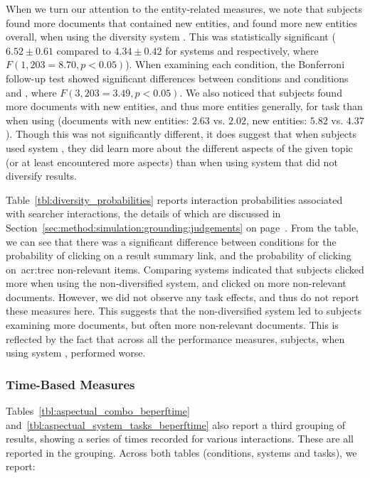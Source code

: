 When we turn our attention to the entity-related measures, we note that subjects found more documents that contained new entities, and found more new entities overall, when using the diversity system . This was statistically significant ($6.52\pm0.61$ compared to $4.34\pm0.42$ for systems  and  respectively, where $F(1,203 = 8.70, p<0.05)$). When examining each condition, the Bonferroni follow-up test showed significant differences between conditions  and conditions  and , where $F(3,203 = 3.49, p < 0.05)$. We also noticed that subjects found more documents with new entities, and thus more entities generally, for task  than when using  (documents with new entities: $2.63$ vs. $2.02$, new entities: $5.82$ vs. $4.37$). Though this was not significantly different, it does suggest that when subjects used system , they did learn more about the different aspects of the given topic (or at least encountered more aspects) than when using system  that did not diversify results.

Table~\ref{tbl:diversity_probabilities} reports interaction probabilities associated with searcher interactions, the details of which are discussed in Section~\ref{sec:method:simulation:grounding:judgements} on page~\pageref{sec:method:simulation:grounding:judgements}. From the table, we can see that there was a significant difference between conditions for the probability of clicking on a result summary link, and the probability of clicking on~\gls{acr:trec} non-relevant items. Comparing systems indicated that subjects clicked more when using the non-diversified system, and clicked on more non-relevant documents. However, we did not observe any task effects, and thus do not report these measures here. This suggests that the non-diversified system  led to subjects examining more documents, but often more non-relevant documents. This is reflected by the fact that across all the performance measures, subjects, when using system , performed worse.

\subsubsection{Time-Based Measures}
Tables~\ref{tbl:aspectual_combo_beperftime} and~\ref{tbl:aspectual_system_tasks_beperftime} also report a third grouping of results, showing a series of times recorded for various interactions. These are all reported in the  grouping. Across both tables (conditions, systems and tasks), we report:

